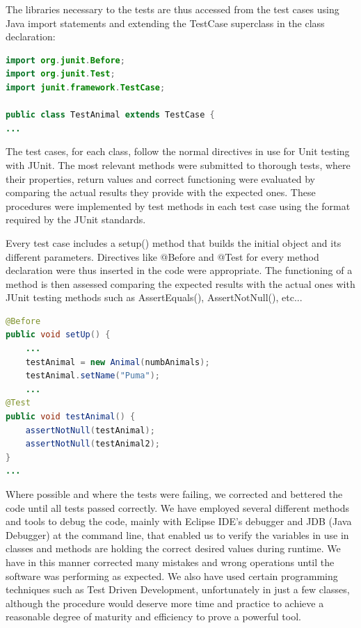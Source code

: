\documentclass[11pt]{report}
\begin{document}
The libraries necessary to the tests are thus accessed from the test cases using Java import statements and extending the TestCase superclass in the class declaration:
\begin{lstlisting}[language=Java,caption= Test case headers]
import org.junit.Before;
import org.junit.Test;
import junit.framework.TestCase;

public class TestAnimal extends TestCase {
...
\end{lstlisting}

The test cases, for each class, follow the normal directives in use for Unit testing with JUnit. The most relevant methods were submitted to thorough tests, where their properties, return values and correct functioning were evaluated by comparing the actual results they provide with the expected ones. These procedures were implemented by test methods in each test case using the format required by the JUnit standards. 

Every test case includes a setup() method that builds the initial object and its different parameters. Directives like @Before and @Test for every method declaration were thus inserted in the code were appropriate. The functioning of a method is then assessed comparing the expected results with the actual ones with JUnit testing methods such as AssertEquals(), AssertNotNull(), etc...

\begin{lstlisting}[language=Java,caption= Use of JUnit directives in test cases]
@Before
public void setUp() {
    ...
    testAnimal = new Animal(numbAnimals);
    testAnimal.setName("Puma");
    ...
@Test
public void testAnimal() {
    assertNotNull(testAnimal);
    assertNotNull(testAnimal2);
} 
...
\end{lstlisting}

Where possible and where the tests were failing, we corrected and bettered the code until all tests passed correctly. We have employed several different methods and tools to debug the code, mainly with Eclipse IDE's debugger and JDB (Java Debugger) at the command line, that enabled us to verify the variables in use in classes and methods are holding the correct desired values during runtime. We have in this manner corrected many mistakes and wrong operations until the software was performing as expected. We also have used certain programming techniques such as Test Driven Development, unfortunately in just a few classes, although the procedure would deserve more time and practice to achieve a reasonable degree of maturity and efficiency to prove a powerful tool. 
\end{document}

